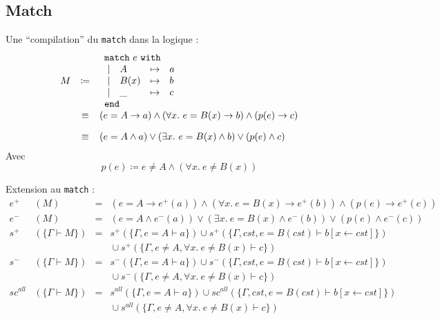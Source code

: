 \documentclass[12pt]{article}
\newcommand{\omatch}{\texttt{match}~}
\newcommand{\owith}{~\texttt{with}}
\newcommand{\oend}{\texttt{end}}
\begin{document}
\newpage

\subsection*{Match}
Une ``compilation'' du \texttt{match} dans la logique :
\[
  \begin{array}{rcl}
    M & \coloneqq &
    \begin{array}{clcl}
      \multicolumn{4}{l}{\omatch e \owith} \\
      ~| & A    & \mapsto & a              \\
      ~| & B(x) & \mapsto & b              \\
      ~| & \_   & \mapsto & c              \\
      \multicolumn{4}{l}{\oend}
    \end{array}                                                                           \\
      & \equiv    & (e = A \rightarrow a ) \land (\forall x.~ e = B(x) \rightarrow b ) \land (p(e) \rightarrow c ) \\[10pt]
      & \equiv    & (e = A \land a ) \lor (\exists x.~ e = B(x) \land b ) \lor (p(e) \land c )                     \\
  \end{array}
\]
Avec
\[
  p(e) \coloneqq e \neq A \land (\forall x.~ e \neq B(x))
\]

\bigskip

Extension au \texttt{match} :
\[
  \begin{array}{rlcl}
    e^+      & (M)                   & = & (e = A \rightarrow e^+(a) ) \land (\forall x.~ e = B(x) \rightarrow e^+(b) ) \land (p(e) \rightarrow e^+(c) ) \\[.8em]
    e^-      & (M)                   & = & (e = A \land e^-(a) ) \lor (\exists x.~ e = B(x) \land e^-(b) ) \lor (p(e) \land e^-(c) )                     \\[.8em]
    s^+      & (\{\Gamma \vdash M\}) & = & s^+ (\{\Gamma, e = A \vdash a\}) \cup s^+ (\{\Gamma, cst, e = B(cst) \vdash b[x\leftarrow cst]\})             \\
             &                       &   & {} \cup s^+ (\{\Gamma, e \neq A, \forall x.~ e \neq B(x) \vdash c\})                                          \\[.8em]
    s^-      & (\{\Gamma \vdash M\}) & = & s^- (\{\Gamma, e = A \vdash a\}) \cup s^- (\{\Gamma, cst, e = B(cst)\vdash b[x\leftarrow cst]\})              \\
             &                       &   & {} \cup s^- (\{\Gamma, e \neq A, \forall x.~ e \neq B(x) \vdash c\})                                          \\[.8em]
    sc^{all} & (\{\Gamma \vdash M\}) & = & s^{all} (\{\Gamma, e = A \vdash a\}) \cup sc^{all} (\{\Gamma, cst, e = B(cst) \vdash b[x\leftarrow cst]\})    \\
             &                       &   & {} \cup s^{all} (\{\Gamma, e \neq A, \forall x.~ e \neq B(x) \vdash c \})
  \end{array}
\]
\end{document}
